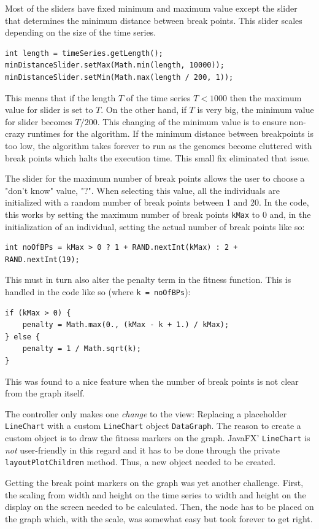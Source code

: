 Most of the sliders have fixed minimum and maximum value except the slider that
determines the minimum distance between break points. This slider scales
depending on the size of the time series. 
\begin{lstlisting}
int length = timeSeries.getLength();
minDistanceSlider.setMax(Math.min(length, 10000));
minDistanceSlider.setMin(Math.max(length / 200, 1));
\end{lstlisting}
This means that if the length $T$ of the time series $T < 1000$ then the maximum
value for slider is set to $T$. On the other hand, if $T$ is very big, the
minimum value for slider becomes $T / 200$. This changing of the minimum value
is to ensure non-crazy runtimes for the algorithm. If the minimum distance
between breakpoints is too low, the algorithm takes forever to run as the
genomes become cluttered with break points which halts the execution time. This
small fix eliminated that issue. 

The slider for the maximum number of break points allows the user to choose a
"don't know" value, "?". When selecting this value, all the individuals are
initialized with a random number of break points between 1 and 20. In the code,
this works by setting the maximum number of break points \texttt{kMax} to 0 and,
in the initialization of an individual, setting the actual number of break
points like so:
\begin{lstlisting}
int noOfBPs = kMax > 0 ? 1 + RAND.nextInt(kMax) : 2 + RAND.nextInt(19);
\end{lstlisting}
This must in turn also alter the penalty term in the fitness function. This is
handled in the code like so (where \texttt{k = noOfBPs}):
\begin{lstlisting}
if (kMax > 0) {
    penalty = Math.max(0., (kMax - k + 1.) / kMax);
} else {
    penalty = 1 / Math.sqrt(k);
}
\end{lstlisting}
This was found to a nice feature when the number of break points is not clear
from the graph itself. 

The controller only makes one \textit{change} to the view: Replacing a
placeholder \texttt{LineChart} with a custom \texttt{LineChart} object
\texttt{DataGraph}. The reason to create a custom object is to draw the fitness
markers on the graph. JavaFX' \texttt{LineChart} is \textit{not} user-friendly
in this regard and it has to be done through the private
\texttt{layoutPlotChildren} method. Thus, a new object needed to be created. 

Getting the break point markers on the graph was yet another challenge. First,
the scaling from width and height on the time series to width and height on the
display on the screen needed to be calculated. Then, the node has to be placed
on the graph which, with the scale, was somewhat easy but took forever to get
right.  

